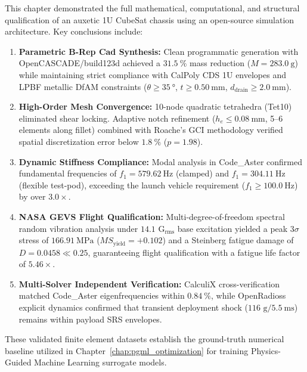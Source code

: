 This chapter demonstrated the full mathematical, computational, and structural qualification of an auxetic 1U CubeSat chassis using an open-source simulation architecture. Key conclusions include:
\begin{enumerate}
\item \textbf{Parametric B-Rep Cad Synthesis:} Clean programmatic generation with OpenCASCADE/build123d achieved a $\SI{31.5}{\percent}$ mass reduction ($M = \SI{283.0}{\gram}$) while maintaining strict compliance with CalPoly CDS 1U envelopes and LPBF metallic DfAM constraints ($\theta \ge \SI{35}{\degree}$, $t \ge \SI{0.50}{\milli\meter}$, $d_{\text{drain}} \ge \SI{2.0}{\milli\meter}$).
\item \textbf{High-Order Mesh Convergence:} 10-node quadratic tetrahedra (Tet10) eliminated shear locking. Adaptive notch refinement ($h_e \le \SI{0.08}{\milli\meter}$, 5--6 elements along fillet) combined with Roache's GCI methodology verified spatial discretization error below $\SI{1.8}{\percent}$ ($p = 1.98$).
\item \textbf{Dynamic Stiffness Compliance:} Modal analysis in Code\_Aster confirmed fundamental frequencies of $f_1 = \SI{579.62}{\hertz}$ (clamped) and $f_1 = \SI{304.11}{\hertz}$ (flexible test-pod), exceeding the launch vehicle requirement ($f_1 \ge \SI{100.0}{\hertz}$) by over $3.0\times$.
\item \textbf{NASA GEVS Flight Qualification:} Multi-degree-of-freedom spectral random vibration analysis under $14.1\text{ G}_{\text{rms}}$ base excitation yielded a peak $3\sigma$ stress of $\SI{166.91}{\mega\pascal}$ ($MS_{\text{yield}} = +0.102$) and a Steinberg fatigue damage of $D = 0.0458 \ll 0.25$, guaranteeing flight qualification with a fatigue life factor of $5.46\times$.
\item \textbf{Multi-Solver Independent Verification:} CalculiX cross-verification matched Code\_Aster eigenfrequencies within $\SI{0.84}{\percent}$, while OpenRadioss explicit dynamics confirmed that transient deployment shock ($116\text{ g} / \SI{5.5}{\milli\second}$) remains within payload SRS envelopes.
\end{enumerate}

These validated finite element datasets establish the ground-truth numerical baseline utilized in Chapter~\ref{chap:pgml_optimization} for training Physics-Guided Machine Learning surrogate models.
